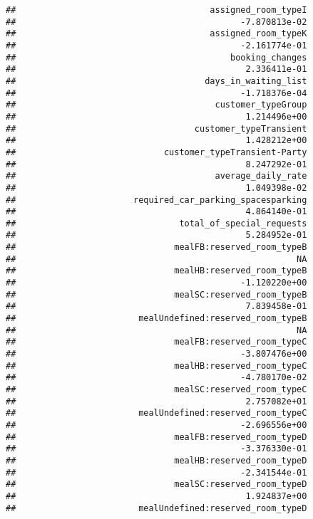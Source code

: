 \documentclass[
]{article}
\begin{document}
\begin{verbatim}
##                                      assigned_room_typeI 
##                                            -7.870813e-02 
##                                      assigned_room_typeK 
##                                            -2.161774e-01 
##                                          booking_changes 
##                                             2.336411e-01 
##                                     days_in_waiting_list 
##                                            -1.718376e-04 
##                                       customer_typeGroup 
##                                             1.214496e+00 
##                                   customer_typeTransient 
##                                             1.428212e+00 
##                             customer_typeTransient-Party 
##                                             8.247292e-01 
##                                       average_daily_rate 
##                                             1.049398e-02 
##                       required_car_parking_spacesparking 
##                                             4.864140e-01 
##                                total_of_special_requests 
##                                             5.284952e-01 
##                               mealFB:reserved_room_typeB 
##                                                       NA 
##                               mealHB:reserved_room_typeB 
##                                            -1.120220e+00 
##                               mealSC:reserved_room_typeB 
##                                             7.839458e-01 
##                        mealUndefined:reserved_room_typeB 
##                                                       NA 
##                               mealFB:reserved_room_typeC 
##                                            -3.807476e+00 
##                               mealHB:reserved_room_typeC 
##                                            -4.780170e-02 
##                               mealSC:reserved_room_typeC 
##                                             2.757082e+01 
##                        mealUndefined:reserved_room_typeC 
##                                            -2.696556e+00 
##                               mealFB:reserved_room_typeD 
##                                            -3.376330e-01 
##                               mealHB:reserved_room_typeD 
##                                            -2.341544e-01 
##                               mealSC:reserved_room_typeD 
##                                             1.924837e+00 
##                        mealUndefined:reserved_room_typeD 

\end{verbatim}
\end{document}
